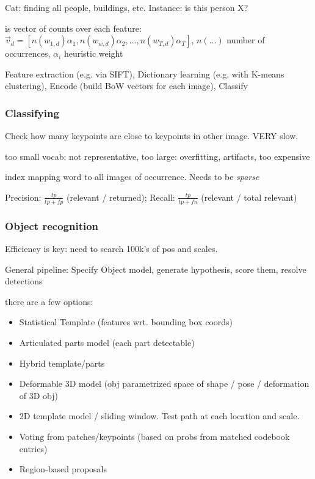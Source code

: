  Cat: finding all people, buildings, etc. Instance: is this person X?

 is vector of counts over each feature: $\vec{v}_d = [n(w_{1, d}) \alpha_1, n(w_{w, d}) \alpha_2, \ldots, n(w_{T, d}) \alpha_T]$,
$n(\ldots)$ number of occurrences, $\alpha_i$ heuristic weight

 Feature extraction (e.g. via SIFT), Dictionary learning (e.g. with K-means clustering),
Encode (build BoW vectors for each image), Classify

\subsubsection{Classifying}
 Check how many keypoints are close to keypoints in other image. VERY slow.

 too small vocab: not representative, too large: overfitting, artifacts, too expensive

 index mapping word to all images of occurrence. Needs to be \textit{sparse}

 Precision: $\frac{tp}{tp + fp}$ (relevant / returned); Recall: $\frac{tp}{tp + fn}$ (relevant / total relevant)

\subsubsection{Object recognition}
Efficiency is key: need to search 100k's of pos and scales.

General pipeline: Specify Object model, generate hypothesis, score them, resolve detections

 there are a few options:
\begin{itemize}
    \item Statistical Template (features wrt. bounding box coords)
    \item Articulated parts model (each part detectable)
    \item Hybrid template/parts
    \item Deformable 3D model (obj parametrized space of shape / pose / deformation of 3D obj)
\end{itemize}

\begin{itemize}
    \item 2D template model / sliding window. Test path at each location and scale.
    \item Voting from patches/keypoints (based on probs from matched codebook entries)
    \item Region-based proposals
\end{itemize}

